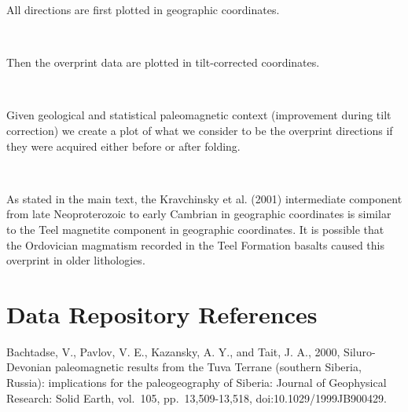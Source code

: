 \documentclass[11pt]{article}
\begin{document}
    All directions are first plotted in geographic coordinates.


    \begin{center}
    \end{center}
    { \hspace*{\fill} \\}
    
    Then the overprint data are plotted in tilt-corrected coordinates.


    \begin{center}
    \end{center}
    { \hspace*{\fill} \\}
    
    Given geological and statistical paleomagnetic context (improvement
during tilt correction) we create a plot of what we consider to be the
overprint directions if they were acquired either before or after
folding.


    \begin{center}
    \end{center}
    { \hspace*{\fill} \\}
    
    As stated in the main text, the Kravchinsky et al. (2001) intermediate
component from late Neoproterozoic to early Cambrian in geographic
coordinates is similar to the Teel magnetite component in geographic
coordinates. It is possible that the Ordovician magmatism recorded in
the Teel Formation basalts caused this overprint in older lithologies.

    \section{Data Repository References}\label{data-repository-references}

    Bachtadse, V., Pavlov, V. E., Kazansky, A. Y., and Tait, J. A., 2000,
Siluro-Devonian paleomagnetic results from the Tuva Terrane (southern
Siberia, Russia): implications for the paleogeography of Siberia:
Journal of Geophysical Research: Solid Earth, vol.~105,
pp.~13,509-13,518, doi:10.1029/1999JB900429.
\end{document}
